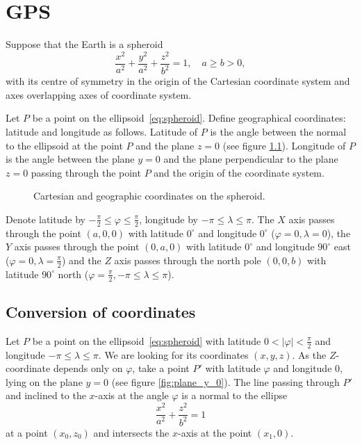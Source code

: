\chapter{GPS}

Suppose that the Earth is a spheroid
\begin{equation}
  \label{eq:spheroid}
  \frac{x^2}{a^2} + \frac{y^2}{a^2} + \frac{z^2}{b^2} = 1, \quad a
  \geq b > 0,
\end{equation}
with its centre of symmetry in the origin of the Cartesian coordinate
system and axes overlapping axes of coordinate system.

Let $P$ be a point on the ellipsoid~\eqref{eq:spheroid}. Define
geographical coordinates: latitude and longitude as follows. Latitude
of $P$ is the angle between the normal to the ellipsoid at the point
$P$ and the plane $z = 0$ (see figure \ref{fig:spheroid_coordinates}).
Longitude of $P$ is the angle between the plane $y = 0$ and the plane
perpendicular to the plane $z = 0$ passing through the point $P$ and
the origin of the coordinate system.

\begin{figure}[ht]
\begin{center}
\end{center}
\caption{Cartesian and geographic coordinates on the spheroid.}
\label{fig:spheroid_coordinates}
\end{figure}

Denote latitude by $-\frac{\pi}{2} \leq \varphi \leq \frac{\pi}{2}$,
longitude by $-\pi \leq \lambda \leq \pi$. The $X$ axis passes through
the point $(a, 0, 0)$ with latitude $0^\circ$ and longitude $0^\circ$
($\varphi = 0, \lambda = 0$), the $Y$ axis passes through the point
$(0, a, 0)$ with latitude $0^\circ$ and longitude $90^\circ$ east
($\varphi = 0, \lambda = \frac{\pi}{2}$) and the $Z$ axis passes
through the north pole $(0, 0, b)$ with latitude $90^\circ$ north
($\varphi = \frac{\pi}{2}, -\pi \leq \lambda \leq \pi$).

\section{Conversion of coordinates}

Let $P$ be a point on the ellipsoid~\eqref{eq:spheroid} with latitude
$0 < |\varphi| < \frac{\pi}{2}$ and longitude $-\pi \leq \lambda \leq
\pi$. We are looking for its coordinates $(x, y, z)$. As the
$Z$-coordinate depends only on $\varphi$, take a point $P'$ with
latitude $\varphi$ and longitude $0$, lying on the plane $y = 0$ (see
figure \ref{fig:plane_y_0}). The line passing through $P'$ and
inclined to the $x$-axis at the angle $\varphi$ is a normal to the
ellipse
\begin{equation} \label{eq:ellipseXZ}
  \frac{x^2}{a^2} + \frac{z^2}{b^2} = 1
\end{equation}
at a point $(x_0, z_0)$ and intersects the $x$-axis at the point
$(x_1, 0)$.

